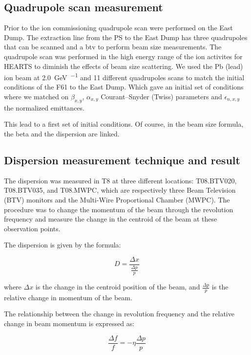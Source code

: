\documentclass[a4paper,
               biblatex,     %
               ]{jacow}
\begin{document}
\subsection{Quadrupole scan measurement}

Prior to the ion commissioning quadrupole scan were performed on the East Dump. The extraction line from the PS to the East Dump has three quadrupoles that can be scanned and a btv to perform beam size measurements. The quadrupole scan was performed in the high energy range of the ion activites for HEARTS to diminish the effects of beam size scattering. We used the Pb (lead) ion beam at \SI{2.0}{\giga\electronvolt\per\nucleon} and 11 different quadrupoles scans to match the initial conditions of the F61 to the East Dump. Which gave an initial set of conditions where we matched on $\beta_{x,y}$, $\alpha_{x,y}$ Courant–Snyder (Twiss) parameters and $\epsilon_{n,x,y}$ the normalized emittances.

This lead to a first set of initial conditions. Of course, in the beam size formula, the beta and the dispersion are linked.



\subsection{Dispersion measurement technique and result}


The dispersion was measured in T8 at three different locations: T08.BTV020, T08.BTV035, and T08.MWPC, which are respectively three Beam Television (BTV) monitors and the Multi-Wire Proportional Chamber (MWPC). The procedure was to change the momentum of the beam through the revolution frequency and measure the change in the centroid of the beam at these observation points.

The dispersion is given by the formula:

\begin{equation}
D = \frac{\Delta x}{\frac{\Delta p}{p}}
\end{equation}

where $\Delta x$ is the change in the centroid position of the beam, and $\frac{\Delta p}{p}$ is the relative change in momentum of the beam.

The relationship between the change in revolution frequency and the relative change in beam momentum is expressed as:

\begin{equation}
\frac{\Delta f}{f} = -\eta \frac{\Delta p}{p}
\end{equation}
\end{document}
